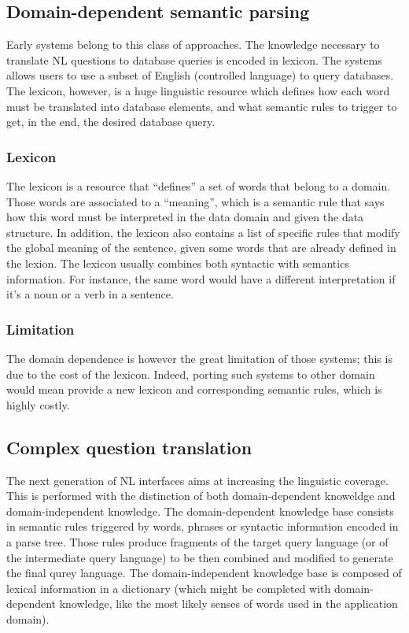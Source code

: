 \documentclass[10pt,journal,letterpaper,compsoc]{IEEEtran}
\begin{document}
\subsection{Domain-dependent semantic parsing}
Early systems belong to this class of approaches.
The knowledge necessary to translate NL questions to database queries
is encoded in lexicon.
The systems allows users to use a subset of English (controlled language) to
query databases. 
The lexicon, however, is a huge linguistic resource which defines how each word
must be translated into database elements, and what semantic rules to trigger to
get, in the end, the desired database query.



\subsubsection{Lexicon}
The lexicon is a resource that ``defines'' a set of words that belong to a
domain. Those words are associated to a ``meaning'', which is a semantic rule
that says how this word must be interpreted in the data domain and given
the data structure.
In addition, the lexicon also contains a list of specific rules that modify 
the global meaning of the sentence, given some words that are already defined in
the lexion.
The lexicon usually combines both syntactic with semantics information.
For instance, the same word would have a different interpretation if it's a noun
or a verb in a sentence. 

\subsubsection{Limitation}
The domain dependence is however the great limitation of those systems; this is
due to the cost of the lexicon. Indeed, porting such systems to other domain
would mean provide a new lexicon and corresponding semantic rules, which is
highly costly.


 







\subsection{Complex question translation}
The next generation of NL interfaces aims at increasing the linguistic coverage.
This is performed with the distinction of both domain-dependent knoweldge and
domain-independent knowledge.
The domain-dependent knowledge base consists in semantic rules triggered by
words, phrases or syntactic information encoded in a parse tree. Those rules
produce fragments of the target query language (or of the intermediate query
language) to be then combined and modified to generate the final qurey language.
The domain-independent knowledge base is composed of lexical information in a
dictionary (which might be completed with domain-dependent knowledge, like the
most likely senses of words used in the application domain).
\end{document}
